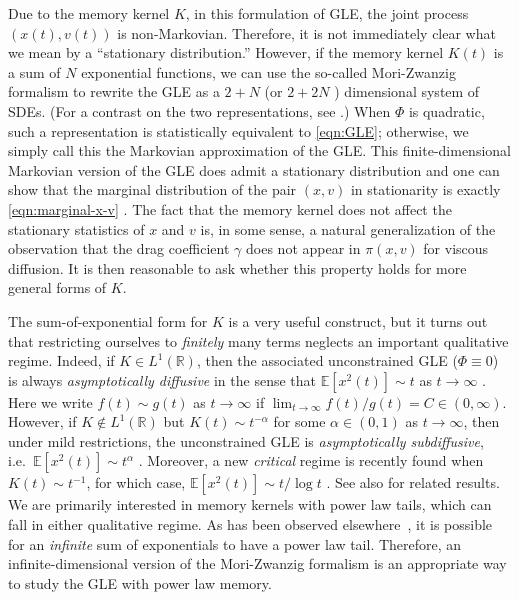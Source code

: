 \documentclass[11pt]{amsart}
\theoremstyle{definition}
\newcommand{\rbb}{\mathbb{R}}
\newcommand{\E}[1]{\mathbb{E}\left[#1\right]}
\theoremstyle{definition}
\theoremstyle{plain}
\numberwithin{equation}{section}
\begin{document}
Due to the memory kernel $K$, in this formulation of GLE, the joint process $(x(t),v(t))$ is non-Markovian.  Therefore, it is not immediately clear what we mean by a ``stationary distribution.'' However, if the memory kernel $K(t)$ is a sum of $N$ exponential functions, we can use the so-called Mori-Zwanzig formalism \cite{zwanzig2001nonequilibrium, goychuk2009viscoelastic, ottobre2011asymptotic} to rewrite the GLE as a $2+N$ (or $2 + 2N$ \cite{fricks2009time}) dimensional system of SDEs. (For a contrast on the two representations, see \cite{hohenegger2018reconstructing}.) When $\Phi$ is quadratic, such a representation is statistically equivalent to \eqref{eqn:GLE}; otherwise, we simply call this the Markovian approximation of the GLE. This  finite-dimensional Markovian version of the GLE does admit a stationary distribution and one can show that the marginal distribution of the pair $(x,v)$ in stationarity is exactly \eqref{eqn:marginal-x-v} \cite{ottobre2011asymptotic,goychuk2012viscoelastic,pavliotis2014stochastic}.  The fact that the memory kernel does not affect the stationary statistics of $x$ and $v$ is, in some sense, a natural generalization of the observation that the drag coefficient $\gamma$ does not appear in $\pi(x,v)$ for viscous diffusion. It is then reasonable to ask whether this property holds for more general forms of $K$.

The sum-of-exponential form for $K$ is a very useful construct, but it turns out that restricting ourselves to \emph{finitely} many terms neglects an important qualitative regime. Indeed, if $K \in L^1(\rbb)$, then the associated unconstrained GLE ($\Phi \equiv 0$) is always \emph{asymptotically diffusive} in the sense that $\E{x^2(t)} \sim t$ as $t \to \infty$ \cite{ottobre2011asymptotic, mckinley2017anomalous}.  Here we write $f(t) \sim g(t)$ as $t \to \infty$ if $\lim_{t \to \infty} f(t)/g(t) = C \in (0,\infty)$.  However, if $K \notin L^1(\rbb)$ but $K(t) \sim t^{-\alpha}$ for some $\alpha \in (0,1)$ as $t \to \infty$, then under mild restrictions, the unconstrained GLE is \emph{asymptotically subdiffusive}, i.e.~$\E{x^2(t)} \sim t^\alpha$ \cite{mckinley2017anomalous}. Moreover, a new \emph{critical} regime is recently found when $K(t)\sim t^{-1}$, for which case, $\mathbb{E}[x^2(t)]\sim t/\log t$ \cite{didier2019asymptotic}. See also \cite{kou2008stochastic,pottier2003aging,sandev2019fractional} for related results. We are primarily interested in memory kernels with power law tails, which can fall in either qualitative regime. As has been observed elsewhere~\cite{abate1999infinite,goychuk2009viscoelastic}, it is possible for an \emph{infinite} sum of exponentials to have a power law tail. Therefore, an infinite-dimensional version of the Mori-Zwanzig formalism is an appropriate way to study the GLE with power law memory.
\end{document}
